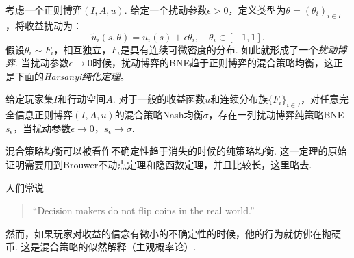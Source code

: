 考虑一个正则博弈$(I,A,u)$. 给定一个扰动参数$\epsilon>0$，定义类型为$\theta=(\theta_i)_{i\in I}$，将收益扰动为：
\[\tilde u_i(s,\theta)=u_i(s)+\epsilon\theta_i,\quad\theta_i\in[-1,1].\]
假设$\theta_i\sim F_i$，相互独立，$F_i$是具有连续可微密度的分布. 如此就形成了一个\emph{扰动博弈}. 当扰动参数$\epsilon\to 0$时候，扰动博弈的BNE趋于正则博弈的混合策略均衡，这正是下面的\emph{Harsanyi纯化定理}。

\begin{theorem}[Harsanyi纯化定理]\label{thm:har}
给定玩家集$I$和行动空间$A$. 对于一般的收益函数$u$和连续分布族$\{F_i\}_{i\in I}$，对任意完全信息正则博弈$(I,A,u)$的混合策略Nash均衡$\sigma$，存在一列扰动博弈纯策略BNE $s_\epsilon$，当扰动参数$\epsilon\to 0$，$s_\epsilon\to \sigma$.
\end{theorem}
混合策略均衡可以被看作不确定性趋于消失的时候的纯策略均衡. 这一定理的原始证明需要用到Brouwer不动点定理和隐函数定理，并且比较长，这里略去.

人们常说
\begin{quotation}
``Decision makers do not flip coins in the real world.''
\end{quotation}

然而，如果玩家对收益的信念有微小的不确定性的时候，他的行为就仿佛在抛硬币. 这是混合策略的似然解释（主观概率论）.

